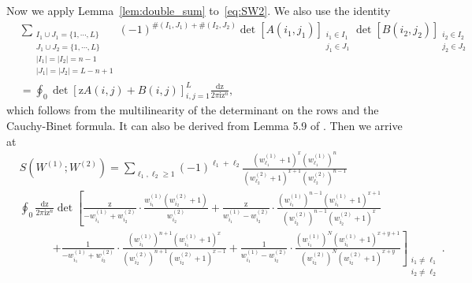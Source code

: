 \documentclass{article}
\numberwithin{equation}{section}
\newcommand{\ddbar}[2]{\frac{{\mathrm d}#1}{2\pi {\mathrm i}#2}}
\newcommand{\rz}{\mathrm{z}}
\begin{document}
Now we apply Lemma~\ref{lem:double_sum} to~\eqref{eq:SW2}. We also use the identity
\begin{equation*}
	\begin{split}
	&\sum_{\substack{I_1\cup J_1 = \{1,\cdots,L\}\\
	                 J_1\cup J_2 = \{1,\cdots,L\}\\
                     |I_1|=|I_2|=n-1\\
                     |J_1|=|J_2|=L-n+1}}
                 (-1)^{\#(I_1,J_1)+\#(I_2,J_2)}
                 \det\left[A(i_1,j_1)\right]_{\substack{i_1\in I_1\\ j_1\in J_1}}
                 \det\left[B(i_2,j_2)\right]_{\substack{i_2\in I_2\\ j_2\in J_2}}\\
    &=\oint_0 \det\left[\rz A(i,j) +B(i,j)\right]_{i,j=1}^L \ddbar{\rz}{\rz^n},
    \end{split}
\end{equation*}
which follows from the multilinearity of the determinant on the rows and the Cauchy-Binet formula. It can also be derived from Lemma 5.9 of \cite{Baik-Liu17}. Then we arrive at
\begin{equation}
	\label{eq:SW3}
	\begin{split}
		&S\left(W^{(1)};W^{(2)}\right)
		=\sum_{\ell_1,\ell_2\ge1} (-1)^{\ell_1+\ell_2}
		\frac{\left(w_{\ell_1}^{(1)} + 1\right)^x
			\left(w_{\ell_1}^{(1)}\right)^n               	     
		}
		{\left(w_{\ell_2}^{(2)} + 1\right)^{x+1}
			\left(w_{\ell_2}^{(2)}\right)^{n-1}
		}\\
	    &\oint_0 \frac{\mathrm{dz}}{2\pi\mathrm{i}\mathrm{z}^n}
	     \det\left[
	               \frac{\rz}{-w_{i_1}^{(1)}+w_{i_2}^{(2)}}
	               \cdot
	               \frac{w_{i_1}^{(1)}\left(w_{i_2}^{(2)}+1\right)}
	                    {w_{i_2}^{(2)}}
	              +\frac{\rz}{w_{i_1}^{(1)}-w_{i_2}^{(2)}}
	               \cdot
	               \frac{\left(w_{i_1}^{(1)}\right)^{n-1}
	               	     \left(w_{i_1}^{(1)}+1\right)^{x+1}
               	        }
	                    {\left(w_{i_2}^{(2)}\right)^{n-1}
	                     \left(w_{i_2}^{(2)}+1\right)^{x}
                        }\right.\\
        &\qquad\quad\left.
                  +\frac{1}{-w_{i_1}^{(1)}+w_{i_2}^{(2)}}
                   \cdot
                   \frac{\left(w_{i_1}^{(1)}\right)^{n+1}
                   	     \left(w_{i_1}^{(1)}+1\right)^x
                        }
                        {\left(w_{i_2}^{(2)}\right)^{n+1}
                         \left(w_{i_2}^{(2)}+1\right)^{x-1}
                        }
                  +\frac{1}{w_{i_1}^{(1)}-w_{i_2}^{(2)}}
                   \cdot
                   \frac{\left(w_{i_1}^{(1)}\right)^{N}
                  	     \left(w_{i_1}^{(1)}+1\right)^{x+y+1}
                        }
                        {\left(w_{i_2}^{(2)}\right)^{N}
                  	     \left(w_{i_2}^{(2)}+1\right)^{x+y}
                        }
	         \right]_{\substack{i_1\ne \ell_1\\
	                            i_2\ne \ell_2}}.
	\end{split}
\end{equation}
\end{document}

